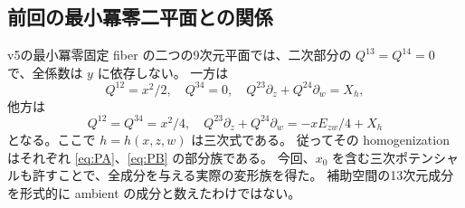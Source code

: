 \subsection{前回の最小冪零二平面との関係}
v5の最小冪零固定 fiber の二つの9次元平面では、二次部分の
$Q^{13}=Q^{14}=0$ で、全係数は $y$ に依存しない。
一方は
\[
 Q^{12}=x^2/2,\quad Q^{34}=0,\quad
 Q^{23}\partial_z+Q^{24}\partial_w=X_h,
\]
他方は
\[
 Q^{12}=Q^{34}=x^2/4,\quad
 Q^{23}\partial_z+Q^{24}\partial_w=-xE_{zw}/4+X_h
\]
となる。ここで $h=h(x,z,w)$ は三次式である。
従ってその homogenization はそれぞれ \eqref{eq:PA}、\eqref{eq:PB} の部分族である。
今回、$x_0$ を含む三次ポテンシャルも許すことで、全成分を与える実際の変形族を得た。
補助空間の13次元成分を形式的に ambient の成分と数えたわけではない。
